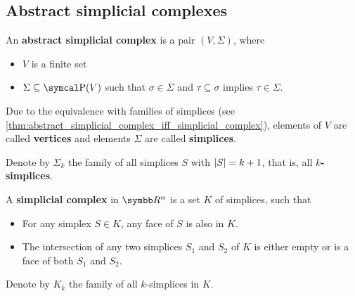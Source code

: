 \subsection{Abstract simplicial complexes}\label{subsec:abstract_simplicial_complexes}

\begin{definition}\label{def:abstract_simplicial_complex}\cite[definition 2.1]{Carlsson2009}
  An \textbf{abstract simplicial complex} is a pair \( (V, \Sigma) \), where
  \begin{itemize}
    \item \( V \) is a finite set
    \item \( \Sigma \subseteq \Power(V) \) such that \( \sigma \in \Sigma \) and \( \tau \subseteq \sigma \) implies \( \tau \in \Sigma \).
  \end{itemize}

  Due to the equivalence with families of simplices (see \cref{thm:abstract_simplicial_complex_iff_simplicial_complex}), elements of \( V \) are called \textbf{vertices} and elements \( \Sigma \) are called \textbf{simplices}.

  Denote by \( \Sigma_k \) the family of all simplices \( S \) with \( \left\vert S \right\vert = k + 1 \), that is, all \textbf{\( k \)-simplices}.
\end{definition}

\begin{definition}\label{def:simplicial_complex}
  A \textbf{simplicial complex} in \( \BB{R}^n \) is a set \( K \) of simplices, such that
  \begin{itemize}
    \item For any simplex \( S \in K \), any face of \( S \) is also in \( K \).
    \item The intersection of any two simplices \( S_1 \) and \( S_2 \) of \( K \) is either empty or is a face of both \( S_1 \) and \( S_2 \).
  \end{itemize}

  Denote by \( K_k \) the family of all \( k \)-simplices in \( K \).
\end{definition}


